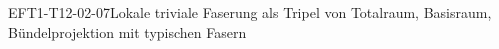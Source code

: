 
\begin{DEF}{EFT1-T12-02-07}{Lokale triviale Faserung als Tripel von Totalraum, Basisraum, Bündelprojektion mit typischen Fasern}
\end{DEF}
